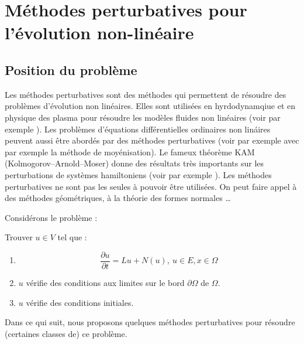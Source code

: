 \documentclass[12pt]{book}
\begin{document}
\section{M\'ethodes perturbatives pour l'\'evolution non-lin\'eaire}\label{partprobevolnl}
\subsection{Position du probl\`eme}
Les m\'ethodes perturbatives sont des m\'ethodes qui permettent de r\'esoudre
des probl\`emes d'\'evolution non lin\'eaires. Elles sont utilis\'ees en
hyrdodynamqiue et en physique des plasma pour r\'esoudre les mod\`eles fluides
non lin\'eaires (voir par exemple \cite{ph:plasm:Chen84}). Les probl\`emes
d'\'equations diff\'erentielles ordinaires non lin\'aires peuvent aussi \^etre
abord\'es par des m\'ethodes perturbatives (voir par exemple
\cite{ma:equad:Arnold80} avec par exemple la m\'ethode de moy\'enisation).  Le fameux th\'eor\`eme KAM
(Kolmogorov--Arnold--Moser) donne des r\'esultats tr\`es importants sur les
perturbations de syst\`emes hamiltoniens (voir par exemple
\cite{ma:equad:Chenciner85}). Les m\'ethodes perturbatives ne sont pas les
seules \`a pouvoir \^etre utilis\'ees. On peut faire appel \`a des m\'ethodes
g\'eom\'etriques, \`a la th\'eorie des formes normales
\cite{ma:equad:Arnold80}\dots 

Consid\'erons le probl\`eme :
\begin{prob}\label{proeqp} 
Trouver $u\in V$ tel que :
\begin{enumerate}
\item 
\begin{equation}
\frac{\partial u}{\partial t}=Lu+N(u),\ u\in E, x\in\Omega
\end{equation}
\item $u$ v\'erifie des conditions aux limites sur le bord
$\partial 
\Omega$ de $\Omega$.
\item $u$ v\'erifie des conditions initiales.
\end{enumerate}
\end{prob}
Dans ce qui suit, nous proposons quelques m\'ethodes perturbatives pour
r\'esoudre (certaines classes de) ce probl\`eme.
\end{document}
